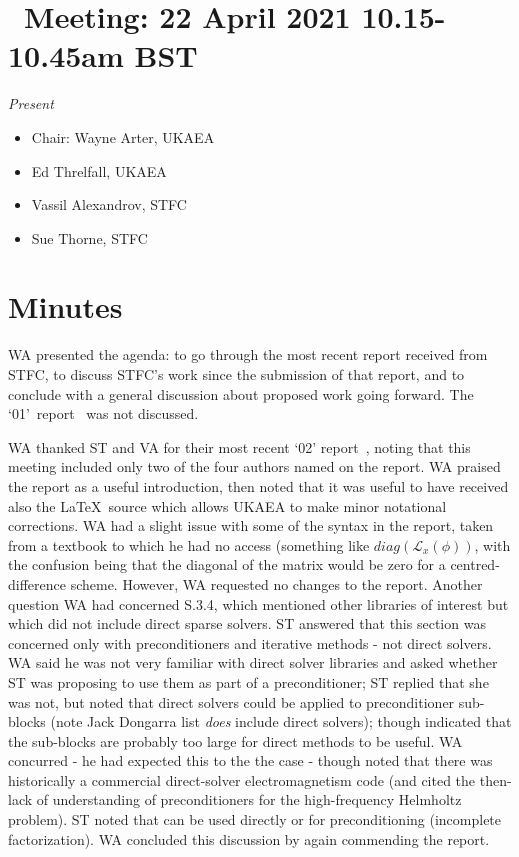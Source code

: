 
\section{{\nep\  Meeting: 22 April 2021 10.15-10.45am BST}}

\emph{Present}

\begin{itemize}
\item Chair: Wayne Arter, UKAEA
\item Ed Threlfall, UKAEA
\item Vassil Alexandrov, STFC
\item Sue Thorne, STFC

\end{itemize}

\section{Minutes}

WA presented the agenda: to go through the most recent report received from STFC, to 
discuss STFC's work since the submission of that report, and to conclude with a 
general discussion about proposed work going forward. The `01'~report~\cite{2047353-TN-01}
was not discussed.

WA thanked ST and VA for their most recent `02' report~\cite{2047353-TN-02}, noting that this 
meeting included only two of the four authors named on the report.  WA praised 
the report as a useful introduction, then noted that it was useful to have 
received also the \LaTeX\ source which allows UKAEA to make minor notational 
corrections.  WA had a slight issue with some of the syntax in the report, 
taken from a textbook to which he had no access (something like 
$diag(\mathcal{L}_x \left ( \phi \right ))$, with the confusion being that the 
diagonal of the matrix would be zero for a centred-difference scheme.  However, 
WA requested no changes to the report.  Another question WA had concerned 
S.3.4, which mentioned other libraries of interest but which did not include 
direct sparse solvers.  ST answered that this section was concerned only with 
preconditioners and iterative methods - not direct solvers.  WA said he was not 
very familiar with direct solver libraries and asked whether ST was proposing 
to use them as part of a preconditioner; ST replied that she was not, but noted 
that direct solvers could be applied to preconditioner sub-blocks (note Jack 
Dongarra list {\it does} include direct solvers); though indicated that the 
sub-blocks are probably too large for direct methods to be useful.  WA 
concurred - he had expected this to the the case - though noted that there was 
historically a commercial direct-solver electromagnetism code (and cited the 
then-lack of understanding of preconditioners for the high-frequency Helmholtz 
problem).  ST noted that  can be used directly or for preconditioning 
(incomplete factorization).  WA concluded this discussion by again commending 
the report.

